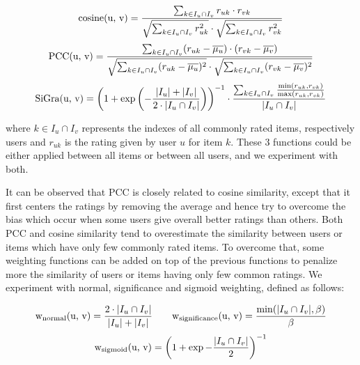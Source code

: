 \documentclass[sigconf]{acmart}
\begin{document}
\footnotesize
\begin{equation*}
    \textrm{\normalsize cosine(u, v)} = \frac{\sum_{k \in I_u \cap I_v} r_{uk} \cdot r_{vk}}{\sqrt{\sum_{k \in I_u \cap I_v} r_{uk}^{2}} \cdot \sqrt{\sum_{k \in I_u \cap I_v} r_{vk}^{2}}}
\end{equation*}
\begin{equation*}
    \textrm{\normalsize PCC(u, v)} = \frac{\sum_{k \in I_u \cap I_v} (r_{uk}-\overline{\mu_u}) \cdot (r_{vk}-\overline{\mu_v})}{\sqrt{\sum_{k \in I_u \cap I_v} (r_{uk}-\overline{\mu_u})^{2}} \cdot \sqrt{\sum_{k \in I_u \cap I_v} (r_{vk}-\overline{\mu_v})^{2}}}
\end{equation*}
\begin{equation*}
    \textrm{\normalsize SiGra(u, v)} = \left(1+\exp{\left(-\frac{|I_u|+|I_v|}{2\cdot |I_u \cap I_v|}\right)}\right)^{-1}
    \cdot
    \frac{\sum_{k \in I_u \cap I_v}\frac{\min(r_{uk}, r_{vk})}{\max(r_{uk}, r_{vk})}}{|I_u \cap I_v|}
\end{equation*}

\vspace*{0.2cm}
\normalsize
\noindent
where $k \in I_u \cap I_v$ represents the indexes of all commonly rated items, respectively users and $r_{uk}$ is the rating given by user $u$ for item $k$.
These 3 functions could be either applied between all items or between all users, and we experiment with both. 

It can be observed that PCC is closely related to cosine similarity, except that it first centers the ratings by removing the average and hence try to overcome the bias which occur when some users give overall better ratings than others. 
Both PCC and cosine similarity tend to overestimate the similarity between users or items which have only few commonly rated items. 
To overcome that, some weighting functions can be added on top of the previous functions to penalize more the similarity of users or items having only few common ratings. 
We experiment with normal, significance and sigmoid weighting, defined as follows:

\footnotesize
\begin{equation*}
    {\text{\normalsize w\textsubscript{normal}(u, v)}} = \frac{2 \cdot |I_u \cap I_v|}{|I_u| + |I_v|}  \qquad {\text{\normalsize w\textsubscript{significance}(u, v)}} = \frac{\min(|I_u \cap I_v|, \beta)}{\beta} 
\end{equation*}
\begin{equation*}
   {\text{\normalsize w\textsubscript{sigmoid}(u, v)}} = \left(1+\exp{-\frac{|I_u \cap I_v|}{2}}\right)^{-1}
\end{equation*}
\end{document}
